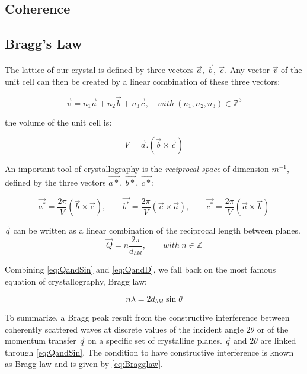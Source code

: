 
\subsection{Coherence}



\subsection{Bragg's Law}

The lattice of our crystal is defined by three vectors $\vec{a},\ \vec{b},\ \vec{c}$. Any vector $\vec{v}$ of the unit cell can then be created by a linear combination of these three vectors:

\begin{equation}
    \vec{v}=n_1\vec{a} + n_2\vec{b} + n_3\vec{c}, \quad with \ (n_1,n_2,n_3) \in \mathbb{Z}^3
\end{equation}{}

the volume of the unit cell is:

\begin{equation}
    V=\vec{a}.(\vec{b}\times \vec{c})
\end{equation}{}

An important tool of crystallography is the \textit{reciprocal space} of dimension $m^{-1}$, defined by the three vectors $\vec{a*},\ \vec{b*},\ \vec{c*}$:

\begin{equation}
    \vec{a^*}=\frac{2\pi}{V}(\vec{b}\times \vec{c}), \qquad
    \vec{b^*}=\frac{2\pi}{V}(\vec{c}\times \vec{a}), \qquad
    \vec{c^*}=\frac{2\pi}{V}(\vec{a}\times \vec{b})
\end{equation}{}

$\vec{q}$ can be written as a linear combination of the reciprocal length between planes.
\begin{equation}
    \label{eq:QandD}
    \vec{Q} = n\frac{2\pi}{d_{hkl}}, \qquad with \ n \in \mathbb{Z}
\end{equation}{}

Combining \eqref{eq:QandSin} and \eqref{eq:QandD}, we fall back on the most famous equation of crystallography, Bragg law:

\begin{equation}
    \label{eq:Bragglaw}
    n\lambda = 2d_{hkl} \sin{\theta}
\end{equation}

To summarize, a Bragg peak result from the constructive interference between coherently scattered waves at discrete values of the incident angle $2\theta$ or of the momentum transfer $\vec{q}$ on a specific set of crystalline planes. $\vec{q}$ and $2\theta$ are linked through \eqref{eq:QandSin}. The condition to have constructive interference is known as Bragg law and is given by \eqref{eq:Bragglaw}.

